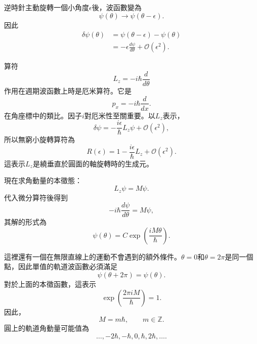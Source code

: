 逆時針主動旋轉一個小角度\(\epsilon\)後，波函數變為
\begin{equation}
\psi(\theta)\longrightarrow\psi(\theta-\epsilon).
\end{equation}
因此
\begin{align}
\delta\psi(\theta)
&=\psi(\theta-\epsilon)-\psi(\theta)\\
&=-\epsilon\frac{d\psi}{d\theta}
+\mathcal O(\epsilon^2).
\end{align}

算符
\begin{equation}
L_z=-i\hbar\frac{d}{d\theta}
\end{equation}
作用在週期波函數上時是厄米算符。它是
\begin{equation}
p_x=-i\hbar\frac{d}{dx}.
\end{equation}
在角座標中的類比。因子\(i\)對厄米性至關重要。以\(L_z\)表示，
\begin{equation}
\delta\psi
=-\frac{i\epsilon}{\hbar}L_z\psi
+\mathcal O(\epsilon^2),
\end{equation}
所以無窮小旋轉算符為
\begin{equation}
R(\epsilon)
=1-\frac{i\epsilon}{\hbar}L_z
+\mathcal O(\epsilon^2).
\end{equation}
這表示\(L_z\)是繞垂直於圓面的軸旋轉時的生成元。

\begin{classroomqa}
\end{classroomqa}

現在求角動量的本徵態：
\begin{equation}
L_z\psi=M\psi.
\end{equation}
代入微分算符後得到
\begin{equation}
-i\hbar\frac{d\psi}{d\theta}=M\psi,
\end{equation}
其解的形式為
\begin{equation}
\psi(\theta)=C\exp\left(\frac{iM\theta}{\hbar}\right).
\end{equation}

這裡還有一個在無限直線上的運動不會遇到的額外條件。\(\theta=0\)和\(\theta=2\pi\)是同一個點，因此單值的軌道波函數必須滿足
\begin{equation}
\psi(\theta+2\pi)=\psi(\theta).
\end{equation}
對於上面的本徵函數，這表示
\begin{equation}
\exp\left(\frac{2\pi iM}{\hbar}\right)=1.
\end{equation}
因此，
\begin{equation}
M=m\hbar,
\qquad
m\in\mathbb Z.
\end{equation}
圓上的軌道角動量可能值為
\begin{equation}
\ldots,-2\hbar,-\hbar,0,\hbar,2\hbar,\ldots.
\end{equation}

